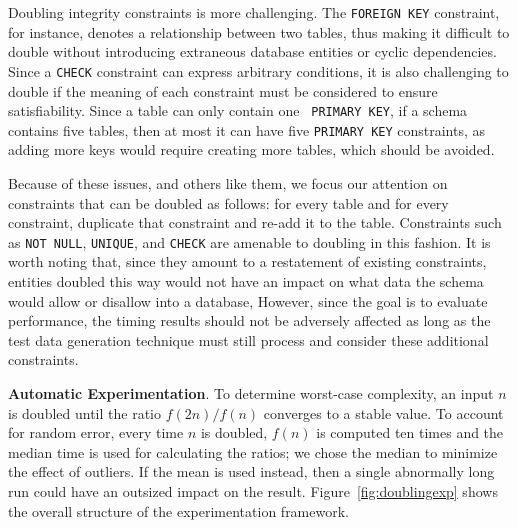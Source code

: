 

  Doubling integrity constraints is more challenging.  The {\tt FOREIGN KEY} constraint, for instance, denotes a relationship
  between two tables, thus making it difficult to double without introducing extraneous database entities or cyclic
  dependencies.  Since a {\tt CHECK} constraint can express arbitrary conditions, it is also challenging to double if the
  meaning of each constraint must be considered to ensure satisfiability.  Since a table can only contain one {\tt
  PRIMARY KEY}, if a schema contains five tables, then at most it can have five {\tt PRIMARY KEY} constraints, as adding more
  keys would require creating more tables, which should be avoided.




  Because of these issues, and others like them, we focus our attention on constraints that can be doubled as follows:
  for every table and for every constraint, duplicate that constraint and re-add it to the table.  Constraints such as
  {\tt NOT NULL}, {\tt UNIQUE}, and {\tt CHECK} are amenable to doubling in this fashion.  It is worth noting that,
  since they amount to a restatement of existing constraints, entities doubled this way would not have an impact on
  what data the schema would allow or disallow into a database, However, since the goal is to evaluate performance, the
  timing results should not be adversely affected as long as the test data generation technique must still process and
  consider these additional constraints.

  \textbf{Automatic Experimentation}. To determine worst-case complexity, an input $n$ is doubled until the ratio $f(2n)
  / f(n)$ converges to a stable value.  To account for random error, every time $n$ is doubled, $f(n)$ is computed ten
  times and the median time is used for calculating the ratios; we chose the median to minimize the effect of outliers.
  If the mean is used instead, then a single abnormally long run could have an outsized impact on the result.
  Figure~\ref{fig:doublingexp} shows the overall structure of the experimentation framework.

